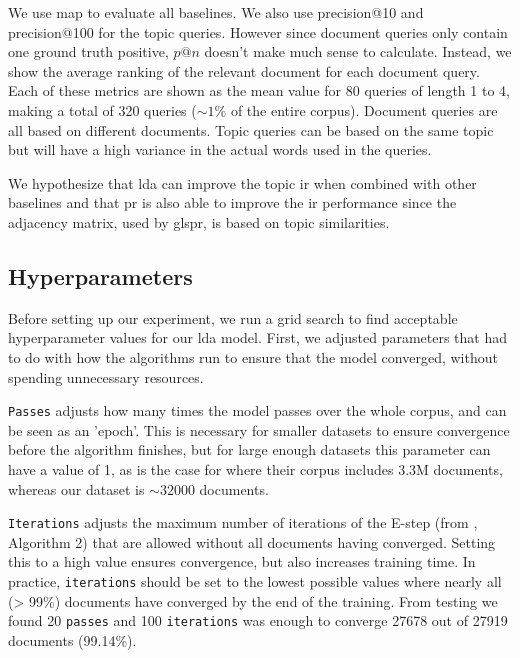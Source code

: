 We use \gls{map} to evaluate all baselines. 
We also use precision@10 and precision@100 for the topic queries. 
However since document queries only contain one ground truth positive, $p @ n$ doesn't make much sense to calculate. 
Instead, we show the average ranking of the relevant document for each document query.
Each of these metrics are shown as the mean value for 80 queries of length 1 to 4, making a total of 320 queries ($\sim$$1\%$ of the entire corpus).
Document queries are all based on different documents. 
Topic queries can be based on the same topic but will have a high variance in the actual words used in the queries.

We hypothesize that \gls{lda} can improve the topic \gls{ir} when combined with other baselines and that \gls{pr} is also able to improve the \gls{ir} performance since the adjacency matrix, used by gls{pr}, is based on topic similarities.


\subsection{Hyperparameters}\label{subsec:hyperparameters}
Before setting up our experiment, we run a grid search to find acceptable hyperparameter values for our \gls{lda} model.
First, we adjusted parameters that had to do with how the algorithms run to ensure that the model converged, without spending unnecessary resources.

\texttt{Passes} adjusts how many times the model passes over the whole corpus, and can be seen as an 'epoch'. 
This is necessary for smaller datasets to ensure convergence before the algorithm finishes, but for large enough datasets this parameter can have a value of 1, as is the case for \citeauthor{blei2010online}\cite{blei2010online} where their corpus includes 3.3M documents, whereas our dataset is $\sim32000$ documents.

\texttt{Iterations} adjusts the maximum number of iterations of the E-step (from \citeauthor{blei2010online}\cite{blei2010online}, Algorithm 2) that are allowed without all documents having converged. 
Setting this to a high value ensures convergence, but also increases training time. 
In practice, \texttt{iterations} should be set to the lowest possible values where nearly all (> 99\%) documents have converged by the end of the training.
From testing we found 20 \texttt{passes} and 100 \texttt{iterations} was enough to converge 27678 out of 27919 documents (99.14\%).

